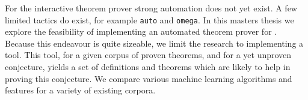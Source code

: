 
For the \coq interactive theorem prover strong automation does not yet exist.
A few limited tactics do exist, for example \texttt{auto} and \texttt{omega}.
In this masters thesis we explore the feasibility of implementing an automated theorem prover for \coq.
Because this endeavour is quite sizeable, we limit the research to implementing a \premiseselection tool.
This tool, for a given corpus of proven theorems, and for a yet unproven conjecture, yields a set of definitions and theorems which are likely to help in proving this conjecture.
We compare various machine learning algorithms and features for a variety of existing \coq corpora.
